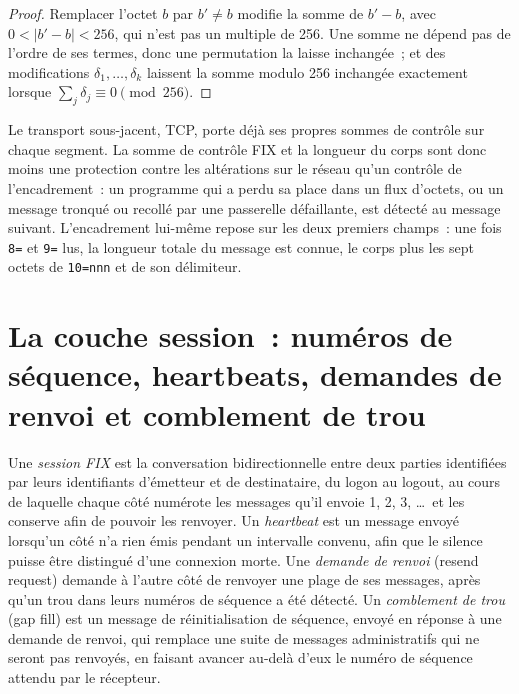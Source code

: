 \begin{proof}
Remplacer l'octet $b$ par $b' \ne b$ modifie la somme de $b' - b$, avec $0 < |b' - b| < 256$, qui n'est pas un multiple de 256.
Une somme ne dépend pas de l'ordre de ses termes, donc une permutation la laisse inchangée~; et des modifications $\delta_1, \dots, \delta_k$
laissent la somme modulo 256 inchangée exactement lorsque $\sum_j \delta_j \equiv 0 \pmod{256}$.
\end{proof}

Le transport sous-jacent, TCP, porte déjà ses propres sommes de contrôle sur chaque segment. La somme de contrôle FIX et la longueur du corps sont
donc moins une protection contre les altérations sur le réseau qu'un contrôle de l'encadrement~: un programme qui a perdu sa place dans un
flux d'octets, ou un message tronqué ou recollé par une passerelle défaillante, est détecté au message suivant. L'encadrement lui-même
repose sur les deux premiers champs~: une fois \texttt{8=} et \texttt{9=} lus, la longueur totale du message est connue, le corps plus les
sept octets de \texttt{10=nnn} et de son délimiteur.

\section{La couche session~: numéros de séquence, heartbeats, demandes de renvoi et comblement de trou}

\begin{definition}\label{def:ll:protocols-i-fix:session}
Une \emph{session FIX} est la conversation bidirectionnelle entre deux parties identifiées par leurs identifiants d'émetteur et
de destinataire, du logon au logout, au cours de laquelle chaque côté numérote les messages qu'il envoie 1, 2, 3, \dots\ et les conserve
afin de pouvoir les renvoyer. Un \emph{heartbeat} est un message envoyé lorsqu'un côté n'a rien émis pendant
un intervalle convenu, afin que le silence puisse être distingué d'une connexion morte. Une \emph{demande de renvoi} (resend request) demande à
l'autre côté de renvoyer une plage de ses messages, après qu'un trou dans leurs numéros de séquence a été détecté. Un
\emph{comblement de trou} (gap fill) est un message de réinitialisation de séquence, envoyé en réponse à une demande de renvoi, qui remplace une suite de messages
administratifs qui ne seront pas renvoyés, en faisant avancer au-delà d'eux le numéro de séquence attendu par le récepteur.
\end{definition}

